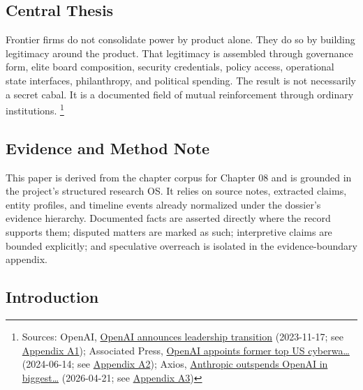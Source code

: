 \documentclass[
  american,
  11pt,
  letterpaper,
]{article}
\begin{document}
\subsection{Central Thesis}\label{central-thesis}

Frontier firms do not consolidate power by product alone. They do so by
building legitimacy around the product. That legitimacy is assembled
through governance form, elite board composition, security credentials,
policy access, operational state interfaces, philanthropy, and political
spending. The result is not necessarily a secret cabal. It is a
documented field of mutual reinforcement through ordinary institutions.
\footnote{Sources: OpenAI,
  \href{https://openai.com/index/openai-announces-leadership-transition/}{OpenAI
  announces leadership transition} (2023-11-17; see
  \hyperref[appendix-a1-openai-announces-leadership-transition]{Appendix
  A1}); Associated Press,
  \href{https://apnews.com/article/6ef612a3a0fcaef05480bbd1ebbd79b1}{OpenAI
  appoints former top US cyberwa\ldots{}} (2024-06-14; see
  \hyperref[appendix-a2-openai-appoints-former-top-us-cyberwarrior-paul-nakasone-to-its-board-of-directors]{Appendix
  A2}); Axios,
  \href{https://www.axios.com/2026/04/21/anthropic-outspends-openai-biggest-lobbying-quarter}{Anthropic
  outspends OpenAI in biggest\ldots{}} (2026-04-21; see
  \hyperref[appendix-a3-anthropic-outspends-openai-in-biggest-ever-lobbying-quarter]{Appendix
  A3})}

\subsection{Evidence and Method Note}\label{evidence-and-method-note}

This paper is derived from the chapter corpus for Chapter 08 and is
grounded in the project's structured research OS. It relies on source
notes, extracted claims, entity profiles, and timeline events already
normalized under the dossier's evidence hierarchy. Documented facts are
asserted directly where the record supports them; disputed matters are
marked as such; interpretive claims are bounded explicitly; and
speculative overreach is isolated in the evidence-boundary appendix.

\subsection{Introduction}\label{introduction}
\end{document}

